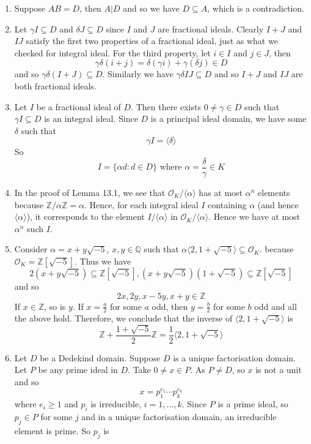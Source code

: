 \begin{enumerate}
\item Suppose $AB=D$, then $A|D$ and so we have $D \subseteq A$, which is a contradiction.
\item Let $\gamma I \subseteq D$ and $\delta J \subseteq D$ since $I$ and $J$ are fractional ideals.
      Clearly $I+J$ and $IJ$ satisfy the first two properties of a fractional ideal, just as what we checked for integral ideal. For the third property, let $i \in I$ and $j \in J$, then
$$\gamma \delta (i+j)=\delta(\gamma i)+\gamma (\delta j) \in D$$
and so $\gamma \delta (I+J)\subseteq D$. Similarly we have $\gamma \delta IJ \subseteq D$
and so $I+J$ and $IJ$ are both fractional ideals.
\item Let $I$ be a fractional ideal of $D$. Then there exists $0 \neq \gamma \in D$ such that $\gamma I \subseteq D$ is an integral ideal. Since $D$ is a principal ideal domain, we have some $\delta$ such that
    $$\gamma I=\langle \delta \rangle$$
    So
    $$I=\{\alpha d :d \in D \} \text{ where } \alpha=\frac{\delta}{\gamma} \in K$$
\item In the proof of Lemma 13.1, we see that $\mathcal{O}_K/ \langle \alpha \rangle$ has at most $\alpha^n$ elements because $\mathbb{Z}/\alpha \mathbb{Z}=\alpha$. Hence, for each integral ideal $I$ containing $\alpha$ (and hence $\langle \alpha \rangle$), it corresponds to the element $I/\langle \alpha \rangle$ in
    $\mathcal{O}_K/\langle \alpha \rangle$. Hence we have at most $\alpha^n$ such $I$.
\item Consider $\alpha= x+y\sqrt{-5}$, $x,y \in \mathbb{Q}$ such that $\alpha \langle 2,1+\sqrt{-5} \rangle \subseteq \mathcal{O}_K$.
because $\mathcal{O}_K=\mathbb{Z}[\sqrt{-5}]$. Thus we have
$$2(x+y\sqrt{-5}) \subseteq \mathbb{Z}[\sqrt{-5}], (x+y\sqrt{-5})(1+\sqrt{-5}) \subseteq \mathbb{Z}[\sqrt{-5}]$$
and so
$$2x,2y,x-5y,x+y \in \mathbb{Z}$$
If $x \in \mathbb{Z}$, so is $y$. If $x=\frac{a}{2}$ for some $a$ odd, then $y=\frac{b}{2}$ for some $b$ odd and all the above hold. Therefore, we conclude that the inverse of $\langle 2, 1+\sqrt{-5} \rangle$ is
$$\mathbb{Z}+\frac{1+\sqrt{-5}}{2}\mathbb{Z}=\frac{1}{2} \langle 2,1+\sqrt{-5}\rangle$$
\item Let $D$ be a Dedekind domain. Suppose $D$ is a unique factorisation domain. Let $P$ be any prime ideal in $D$. Take $0 \neq x \in P$. As $P \neq D$, so $x$ is not a unit and so
    $$x=p^{e_1}_1 \cdots p^{e_k}_k$$
    where $e_i \ge 1$ and $p_i$ is irreducible, $i=1,\ldots,k$. Since $P$ is a prime ideal, so
    $p_j \in P$ for some $j$ and in a unique factorisation domain, an irreducible element is prime. So $p_j$ is

\end{enumerate}
